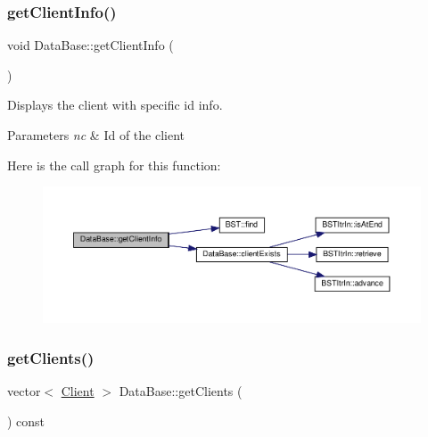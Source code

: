\subsubsection{\texorpdfstring{get\+Client\+Info()}{getClientInfo()}}
{\footnotesize\ttfamily void Data\+Base\+::get\+Client\+Info (\begin{DoxyParamCaption}{ }\end{DoxyParamCaption})}



Displays the client with specific id info. 


\begin{DoxyParams}{Parameters}
{\em nc} & Id of the client \\
\hline
\end{DoxyParams}
Here is the call graph for this function\+:\nopagebreak
\begin{figure}[H]
\begin{center}
\leavevmode
\includegraphics[width=350pt]{classDataBase_aa613181e1960fa22305feae26560960b_cgraph}
\end{center}
\end{figure}
\mbox{\label{classDataBase_a9ad743bfac0c4b7b4a6f2eaa1d4e8160}} 
\subsubsection{\texorpdfstring{get\+Clients()}{getClients()}}
{\footnotesize\ttfamily vector$<$ \hyperlink{classClient}{Client} $>$ Data\+Base\+::get\+Clients (\begin{DoxyParamCaption}{ }\end{DoxyParamCaption}) const}

\mbox{\label{classDataBase_a5c7fcbdcc70d9ac4e27188d39b8c9e1a}} 
